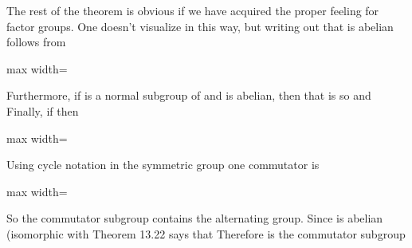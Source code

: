 \documentclass[11pt,oneside]{article}
\begin{document}
\begin{BookBody}

The rest of the theorem is obvious if we have acquired the proper feeling for factor groups. One doesn’t visualize in this way, but writing out that  is abelian follows from

\begin{center}\begin{adjustbox}{max width=\linewidth}\end{adjustbox}\end{center}

\noindent Furthermore, if  is a normal subgroup of  and  is abelian, then   that is so  and  Finally, if   then

\begin{center}\begin{adjustbox}{max width=\linewidth}\end{adjustbox}\end{center} \BookEnd{\blacklozenge}

 Using cycle notation in the symmetric group  one commutator is

\begin{center}\begin{adjustbox}{max width=\linewidth}\end{adjustbox}\end{center}

\noindent So the commutator subgroup  contains  the alternating group. Since  is abelian (isomorphic with  Theorem 13.22 says that  Therefore is the commutator subgroup\BookEnd{\blacktriangle}

\end{BookBody}
\end{document}
